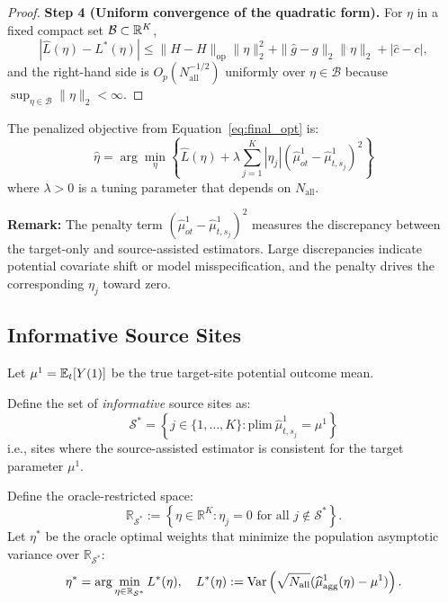 \documentclass{article}
\begin{document}
\begin{proof}
\textbf{Step 4 (Uniform convergence of the quadratic form).}
For $\eta$ in a fixed compact set $\mathcal{B}\subset\mathbb{R}^K$,
\[
|\widehat{L}(\eta)-L^*(\eta)|
\le
\|\widehat{H}-H\|_{\mathrm{op}}\|\eta\|_2^2 + \|\widehat{g}-g\|_2\|\eta\|_2 + |\widehat{c}-c|,
\]
and the right-hand side is $O_p(N_{\mathrm{all}}^{-1/2})$ uniformly over $\eta\in\mathcal{B}$ because $\sup_{\eta\in\mathcal{B}}\|\eta\|_2<\infty$.
\end{proof}

The penalized objective from Equation~\eqref{eq:final_opt} is:
\begin{equation}\label{eq:penalized_obj}
\widehat{\eta} = \arg\min_\eta \left\{ \widehat{L}(\eta) + \lambda \sum_{j=1}^K |\eta_j| \left( \widehat{\mu}^1_{ot} - \widehat{\mu}^1_{t,s_j} \right)^2 \right\}
\end{equation}
where $\lambda > 0$ is a tuning parameter that depends on $N_{\mathrm{all}}$.

\textbf{Remark:} The penalty term $(\widehat{\mu}^1_{ot} - \widehat{\mu}^1_{t,s_j})^2$ measures the discrepancy between the target-only and source-assisted estimators. Large discrepancies indicate potential covariate shift or model misspecification, and the penalty drives the corresponding $\eta_j$ toward zero.

\subsection{Informative Source Sites}

Let $\mu^1 = \operatorname{\mathbb{E}}_t[Y(1)]$ be the true target-site potential outcome mean.

Define the set of \textit{informative} source sites as:
\[
\mathcal{S}^* = \left\{ j \in \{1, \ldots, K\} : \text{plim}\ \widehat{\mu}^1_{t,s_j} = \mu^1 \right\}
\]
i.e., sites where the source-assisted estimator is consistent for the target parameter $\mu^1$.

Define the oracle-restricted space:
\[
\mathbb{R}_{\mathcal{S}^*} := \left\{ \eta \in \mathbb{R}^K : \eta_j = 0 \text{ for all } j \notin \mathcal{S}^* \right\}.
\]
Let $\eta^*$ be the oracle optimal weights that minimize the population asymptotic variance over $\mathbb{R}_{\mathcal{S}^*}$:
\[
\eta^* = \arg\min_{\eta \in \mathbb{R}_{\mathcal{S}^*}} L^*(\eta), \quad
L^*(\eta) := \operatorname{Var}\left( \sqrt{N_{\mathrm{all}}}(\widehat{\mu}^1_{\text{agg}}(\eta) - \mu^1) \right).
\]
\end{document}
